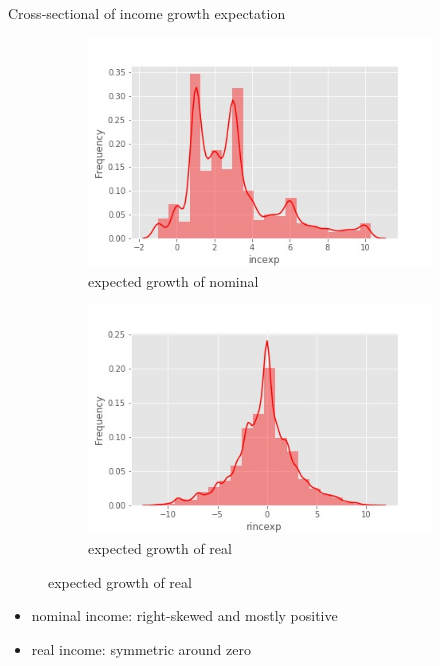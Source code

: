 \documentclass{beamer}
\begin{document}
\begin{frame}{Cross-sectional of income growth expectation}
	\begin{figure}
		\centering
		\label{incexp_hist}
		\begin{subfigure}[b]{0.45\textwidth}
			\centering
			\caption{expected growth of nominal}
			\includegraphics[width=\textwidth]{figures/hist_incexp}
		\end{subfigure}
		\begin{subfigure}[b]{0.45\textwidth}
			\centering
			\caption{expected growth of real}
			\includegraphics[width=\textwidth]{figures/hist_rincexp}
		\end{subfigure}
	\end{figure}
	\begin{itemize}
		\item nominal income: right-skewed and mostly positive   
		\item real income: symmetric around zero  
	\end{itemize}
\end{frame}
\end{document}
